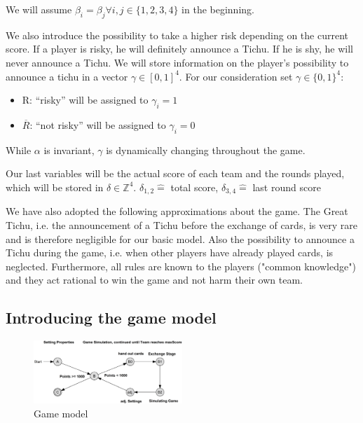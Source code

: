 We will assume  $\beta_i = \beta_j \forall i, j\in \{1,2,3,4\}$ in the beginning. 

We also introduce the possibility to take a higher risk depending on the current score. If a player is risky, he will definitely announce a Tichu. If he is shy, he will never announce a Tichu. We will store information on the player's possibility to announce a tichu in a vector $\gamma \in [0,1]^4$. For our consideration set  $\gamma \in \{0,1\}^4$: \\
\begin{itemize}
\item R: “risky” will be assigned to $\gamma_i = 1$
\item $\overline{R}$: “not risky” will be assigned to $\gamma_i = 0$ \\
\end{itemize}
While $\alpha$ is invariant, $\gamma$ is dynamically changing throughout the game. 

Our last variables will be the actual score of each team and the rounds played, which will be stored in $\delta \in \mathbb{Z}^4$. 
$\delta_{1,2} \widehat{=}$ total score, $\delta_{3,4} \widehat{=}$ last round score

We have also adopted the following approximations about the game.
The Great Tichu, i.e. the announcement of a Tichu before the exchange of cards, is very rare and is therefore negligible for our basic model.
Also the possibility to announce a Tichu during the game, i.e. when other players have already played cards, is neglected.
Furthermore, all rules are known to the players ("common knowledge") and they act rational to win the game and not harm their own team. 

\subsection{Introducing the game model}

\begin{figure}[h]
    \centering
    \includegraphics[width=0.5\textwidth]{Bilder/graph}
    \caption{Game model}
    \label{fig:meine-grafik}
\end{figure}

